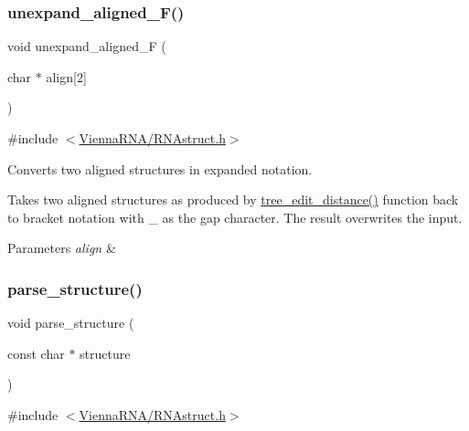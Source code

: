 \subsubsection{\texorpdfstring{unexpand\_aligned\_F()}{unexpand\_aligned\_F()}}
{\footnotesize\ttfamily void unexpand\+\_\+aligned\+\_\+F (\begin{DoxyParamCaption}\item[{char $\ast$}]{align\mbox{[}2\mbox{]} }\end{DoxyParamCaption})}



{\ttfamily \#include $<$\mbox{\hyperlink{RNAstruct_8h}{Vienna\+R\+N\+A/\+R\+N\+Astruct.\+h}}$>$}



Converts two aligned structures in expanded notation. 

Takes two aligned structures as produced by \mbox{\hyperlink{treedist_8h_a3b21f1925f7071f46d93431a835217bb}{tree\+\_\+edit\+\_\+distance()}} function back to bracket notation with \textquotesingle{}\+\_\+\textquotesingle{} as the gap character. The result overwrites the input.


\begin{DoxyParams}{Parameters}
{\em align} & \\
\hline
\end{DoxyParams}
\mbox{\label{group__struct__utils__deprecated_ga3c79042e6bf6f01706bf30ec9e69e8ac}} 
\subsubsection{\texorpdfstring{parse\_structure()}{parse\_structure()}}
{\footnotesize\ttfamily void parse\+\_\+structure (\begin{DoxyParamCaption}\item[{const char $\ast$}]{structure }\end{DoxyParamCaption})}



{\ttfamily \#include $<$\mbox{\hyperlink{RNAstruct_8h}{Vienna\+R\+N\+A/\+R\+N\+Astruct.\+h}}$>$}



